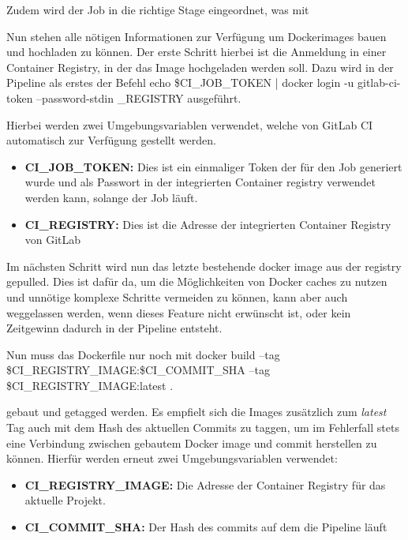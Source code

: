 Zudem wird der Job in die richtige Stage eingeordnet, was mit %

Nun stehen alle nötigen Informationen zur Verfügung um Dockerimages bauen und hochladen zu können.
Der erste Schritt hierbei ist die Anmeldung in einer Container Registry, in der das Image hochgeladen werden soll.
Dazu wird in der Pipeline als erstes der Befehl
echo \$CI_JOB_TOKEN | docker login -u gitlab-ci-token --password-stdin \CI_REGISTRY
ausgeführt.

Hierbei werden zwei Umgebungsvariablen verwendet, welche von GitLab CI automatisch zur Verfügung gestellt werden.~\cite{PredefinedVariablesReference}
\begin{itemize}
    \item \textbf{CI\_JOB\_TOKEN:} Dies ist ein einmaliger Token der für den Job generiert wurde und als Passwort in der integrierten Container registry verwendet werden kann, solange der Job läuft.
    \item \textbf{CI\_REGISTRY:} Dies ist die Adresse der integrierten Container Registry von GitLab
\end{itemize}

Im nächsten Schritt wird nun das letzte bestehende docker image aus der registry gepulled.
Dies ist dafür da, um die Möglichkeiten von Docker caches zu nutzen und unnötige komplexe Schritte vermeiden zu können, kann aber auch weggelassen werden, wenn dieses Feature nicht erwünscht ist, oder kein Zeitgewinn dadurch in der Pipeline entsteht.

Nun muss das Dockerfile nur noch mit
docker build --tag \$CI_REGISTRY_IMAGE:\$CI_COMMIT_SHA --tag \$CI_REGISTRY_IMAGE:latest .

gebaut und getagged werden.
Es empfielt sich die Images zusätzlich zum \textit{latest} Tag auch mit dem Hash des aktuellen Commits zu taggen, um im Fehlerfall stets eine Verbindung zwischen gebautem Docker image und commit herstellen zu können.
Hierfür werden erneut zwei Umgebungsvariablen verwendet:\cite{PredefinedVariablesReference}
\begin{itemize}
    \item \textbf{CI\_REGISTRY\_IMAGE:} Die Adresse der Container Registry für das aktuelle Projekt.
    \item \textbf{CI\_COMMIT\_SHA:} Der Hash des commits auf dem die Pipeline läuft
\end{itemize}


